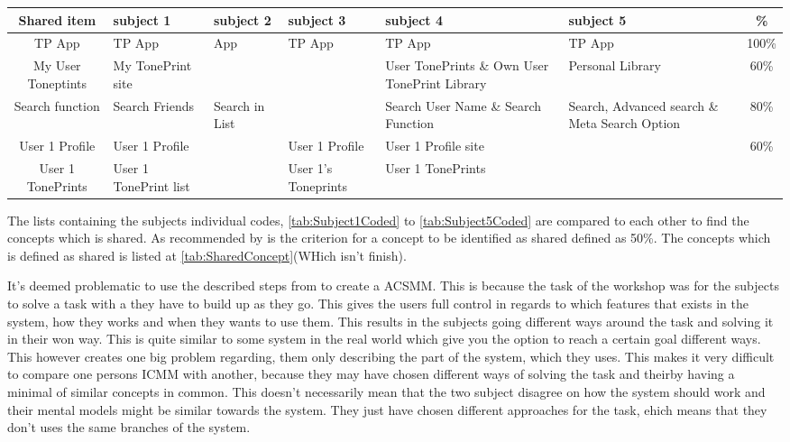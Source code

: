 \begin{table}[]
	\centering
	\begin{tabular}[width=\textwidth]{c|lllllc}
\hline 
Shared item & subject 1 & subject 2 & subject 3 & subject 4 & subject 5 & \%	\\ \hline
TP App & TP App & App & TP App & TP App & TP App & 100\%	\\ 
My User Toneptints & My TonePrint site &  &  & User TonePrints \& Own User TonePrint Library & Personal Library & 60\% \\
Search function & Search Friends & Search in List & & Search User Name \& Search Function & Search, Advanced search \& Meta Search Option & 80\% \\
User 1 Profile & User 1 Profile & & User 1 Profile & User 1 Profile site & & 60\% \\
User 1 TonePrints & User 1 TonePrint list & & User 1's Toneprints & User 1 TonePrints
	\end{tabular}
\end{table}

The lists containing the subjects individual codes, \autoref{tab:Subject1Coded} to \autoref{tab:Subject5Coded} are compared to each other to find the concepts which is shared. As recommended by \textcite{WEB:ConceptMapAnalysis} is the criterion for a concept to be identified as shared defined as 50\%. The concepts which is defined as shared is listed at \autoref{tab:SharedConcept}(WHich isn't finish). 

It's deemed problematic to use the described steps from \textcite{WEB:ConceptMapAnalysis} to create a ACSMM. This is because the task of the workshop was for the subjects to solve a task with a they have to build up as they go. This gives the users full control in regards to which features that exists in the system, how they works and when they wants to use them. This results in the subjects going different ways around the task and solving it in their won way. This is quite similar to some system in the real world which give you the option to reach a certain goal different ways. This however creates one big problem regarding, them only describing the part of the system, which they uses. This makes it very difficult to compare one persons ICMM with another, because they may have chosen different ways of solving the task and theirby having a minimal of similar concepts in common. This doesn't necessarily mean that the two subject disagree on how the system should work and their mental models might be similar towards the system. They just have chosen different approaches for the task, ehich means that they don't uses the same branches of the system. \\


